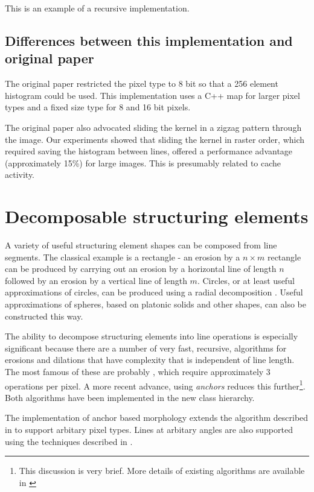 \documentclass{InsightArticle}
\begin{document}
This is an example of a recursive implementation.

\subsection{Differences between this implementation and original paper}
The original paper restricted the pixel type to 8 bit so that a 256
element histogram could be used. This implementation uses a C++ map
for larger pixel types and a fixed size type for 8 and 16 bit pixels.

The original paper also advocated sliding the kernel in a zigzag
pattern through the image. Our experiments showed that sliding the
kernel in raster order, which required saving the histogram between
lines, offered a performance advantage (approximately 15\%) for large
images. This is presumably related to cache activity.

\section{Decomposable structuring elements}
A variety of useful structuring element shapes can be composed from
line segments. The classical example is a rectangle - an erosion by a
$n \times m$ rectangle can be produced by carrying out an erosion by a
horizontal line of length $n$ followed by an erosion by a vertical
line of length $m$. Circles, or at least useful approximations of
circles, can be produced using a radial decomposition
\cite{Adams93}. Useful approximations of spheres, based on platonic
solids and other shapes, can also be constructed this way.

The ability to decompose structuring elements into line operations is
especially significant because there are a number of very fast,
recursive, algorithms for erosions and dilations that have complexity
that is independent of line length. The most famous of these are
probably \cite{vanHerk1992a,Gil1993}, which require approximately 3
operations per pixel. A more recent advance, using {\em anchors}
\cite{Vandroogenbroeck2005Morphological} reduces this
further\footnote{This discussion is very brief. More details of
existing algorithms are available in
\cite{Vandroogenbroeck2005Morphological}}. Both algorithms have been
implemented in the new class hierarchy.

The implementation of anchor based morphology extends the algorithm
described in \cite{Vandroogenbroeck2005Morphological} to support
arbitary pixel types. Lines at arbitary angles are also supported
using the techniques described in \cite{soille-breen-jones96}.
\end{document}
